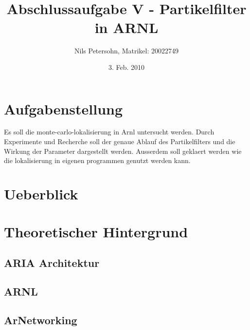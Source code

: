 \documentclass{article}
\title{Abschlussaufgabe V - Partikelfilter in ARNL}
\author{Nils Petersohn, Matrikel: 20022749}
\date{3. Feb. 2010}
\begin{document}
\maketitle



\section{Aufgabenstellung}
Es soll die monte-carlo-lokalisierung in Arnl untersucht werden. Durch Experimente und Recherche soll der genaue Ablauf des Partikelfilters und die Wirkung der Parameter dargestellt werden. Ausserdem soll geklaert werden wie die lokalisierung in eigenen programmen genutzt werden kann.


\section{Ueberblick}


\section{Theoretischer Hintergrund}\label{previous work}

\subsection{ARIA Architektur}
\subsection{ARNL}
\subsection{ArNetworking}







\end{document}

